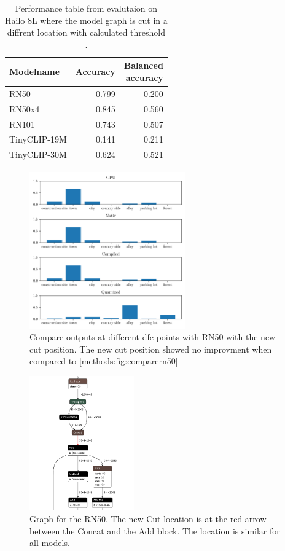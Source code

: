 \begin{table}[]
    \centering
    \begin{tabular}{l|rr}
        \hline
        Modelname & Accuracy &  \makecell{Balanced \\accuracy}\\ \hline
        RN50 & 0.799 & 0.200  \\ 
        RN50x4 & 0.845 & 0.560 \\
        RN101 & 0.743& 0.507 \\  
        TinyCLIP-19M & 0.141 & 0.211 \\ 
        TinyCLIP-30M & 0.624 & 0.521 \\ 
    \end{tabular}
    \caption{Performance table from evalutaion on Hailo 8L where the model graph is cut in a diffrent location with calculated threshold .}
    \label{methods:tab:perfHailocutTh}
\end{table}


\begin{figure}[]
    \centering
    \includegraphics[width=0.6\textwidth]{Images/Implementation/compareProbs_newCut_RN50.png}
    \caption{Compare outputs at different \acrshort{dfc} points with RN50 with the new cut position. The new cut position showed no improvment when compared to \cref{methods:fig:comparern50}}
    \label{methods:fig:comparern50newcut}
\end{figure}

\begin{figure}[]
    \centering
    \includegraphics[width=0.4\textwidth]{Images/Implementation/secondcutlocation.png}
    \caption{Graph for the RN50. The new Cut location is at the red arrow between the Concat and the Add block.
    The location is similar for all models.}
    \label{methods:fig:rn50newcut}
\end{figure}

